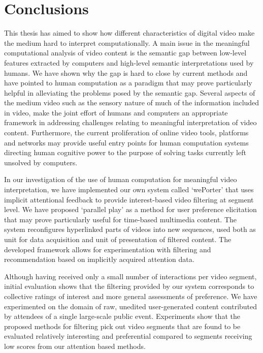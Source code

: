 \chapter{Conclusions}
\label{ch:conclusions}
 
This thesis has aimed to show how different characteristics of digital video make the medium hard to interpret computationally. A main issue in the meaningful computational analysis of video content is the semantic gap between low-level features extracted by computers and high-level semantic interpretations used by humans. We have shown why the gap is hard to close by current methods and have pointed to human computation as a paradigm that may prove particularly helpful in alleviating the problems posed by the semantic gap.
Several aspects of the medium video such as the sensory nature of much of the information included in video, make the joint effort of humans and computers an appropriate framework in addressing challenges relating to meaningful interpretation of video content. Furthermore, the current proliferation of online video tools, platforms and networks may provide useful entry points for human computation systems directing human cognitive power to the purpose of solving tasks currently left unsolved by computers.

In our investigation of the use of human computation for meaningful video interpretation, we have implemented our own system called `wePorter' that uses implicit attentional feedback to provide interest-based video filtering at segment level. We have proposed `parallel play' as a method for user preference elicitation that may prove  particularly useful for time-based multimedia content. The system reconfigures hyperlinked parts of videos into new sequences, used both as unit for data acquisition and unit of presentation of filtered content. The developed framework allows for experimentation with filtering and recommendation based on implicitly acquired attention data.

Although having received only a small number of interactions per video segment, initial evaluation shows that the filtering provided by our system corresponds to collective ratings of interest and more general assessments of preference. We have experimented on the domain of raw, unedited user-generated content contributed by attendees of a single large-scale public event. Experiments show that the proposed methods for filtering pick out video segments that are found to be evaluated relatively interesting and preferential compared to segments receiving low scores from our attention based methods.
